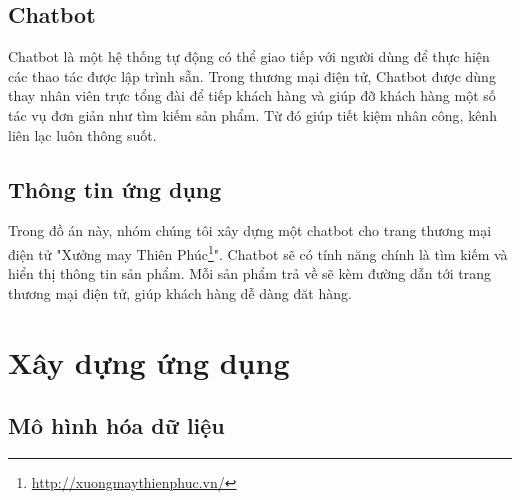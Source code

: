 \subsection{Chatbot}
	Chatbot là một hệ thống tự động có thể giao tiếp với người dùng để thực hiện các thao tác được lập trình sẵn.  Trong thương mại điện tử, Chatbot được dùng thay nhân viên trực tổng đài để tiếp khách hàng và giúp đỡ khách hàng một số tác vụ đơn giản như tìm kiếm sản phẩm. Từ đó giúp tiết kiệm nhân công, kênh liên lạc luôn thông suốt.
	

\subsection{Thông tin ứng dụng}

Trong đồ án này, nhóm chúng tôi xây dựng một chatbot cho trang thương mại điện tử "Xưởng may Thiên Phúc\footnote{\url{http://xuongmaythienphuc.vn/}}". Chatbot sẽ có tính năng chính là tìm kiếm và hiển thị thông tin sản phẩm. Mỗi sản phẩm trả về sẽ kèm đường dẫn tới trang thương mại điện tử, giúp khách hàng dễ dàng đăt hàng.










\section{Xây dựng ứng dụng}

\subsection{Mô hình hóa dữ liệu}

